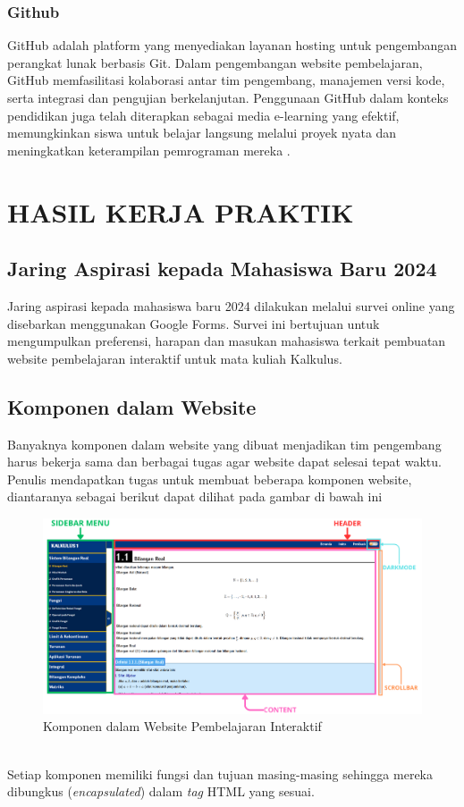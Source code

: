 \documentclass{file/KP-ITS}
\theoremstyle{definition}
\theoremstyle{definition}
\theoremstyle{plain}
\begin{document}
\subsection{Github}

GitHub adalah platform yang menyediakan layanan hosting untuk pengembangan perangkat lunak berbasis Git. Dalam pengembangan website pembelajaran, GitHub memfasilitasi kolaborasi antar tim pengembang, manajemen versi kode, serta integrasi dan pengujian berkelanjutan. Penggunaan GitHub dalam konteks pendidikan juga telah diterapkan sebagai media e-learning yang efektif, memungkinkan siswa untuk belajar langsung melalui proyek nyata dan meningkatkan keterampilan pemrograman mereka \cite{rahmawati2021penerapan}.


\chapter{HASIL KERJA PRAKTIK}
\section{Jaring Aspirasi kepada Mahasiswa Baru 2024}

Jaring aspirasi kepada mahasiswa baru 2024 dilakukan melalui survei online yang disebarkan menggunakan Google Forms. Survei ini bertujuan untuk mengumpulkan preferensi, harapan dan masukan mahasiswa terkait pembuatan website pembelajaran interaktif untuk mata kuliah Kalkulus. 

\section{Komponen dalam Website}

Banyaknya komponen dalam website yang dibuat menjadikan tim pengembang harus bekerja sama dan berbagai tugas agar website dapat selesai tepat waktu. Penulis mendapatkan tugas untuk membuat beberapa komponen website, diantaranya sebagai berikut dapat dilihat pada gambar di bawah ini
\begin{figure}[h!]
    \centering
    \includegraphics[width=\textwidth]{foto/KomponenWeb.png}
    \caption{Komponen dalam Website Pembelajaran Interaktif}
\end{figure}\\
Setiap komponen memiliki fungsi dan tujuan masing-masing sehingga mereka dibungkus (\textit{encapsulated}) dalam \textit{tag} HTML yang sesuai. 
\end{document}

